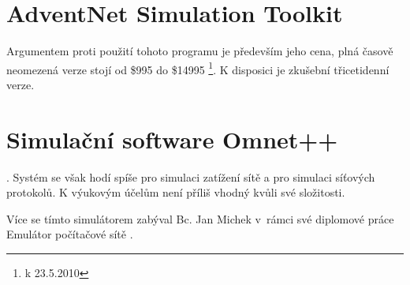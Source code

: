 
\section{AdventNet Simulation Toolkit}


\cite{resersni_bakalarka} Argumentem proti použití tohoto programu je především jeho cena, plná časově neomezená verze stojí od \$995 do \$14995 \footnote{k 23.5.2010}. K disposici je zkušební třicetidenní verze.




\section{Simulační software Omnet++}

\cite{resersni_bakalarka}. Systém se však hodí spíše pro simulaci zatížení sítě a pro simulaci síťových protokolů. K výukovým účelům není příliš vhodný kvůli své složitosti.

Více se tímto simulátorem zabýval Bc. Jan Michek v~rámci své diplomové práce Emulátor počítačové sítě \cite{reserse:omnet_dp}.

